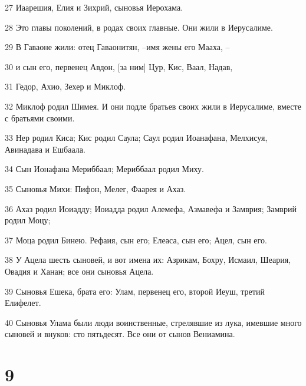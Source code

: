\par 27 Иаарешия, Елия и Зихрий, сыновья Иерохама.
\par 28 Это главы поколений, в родах своих главные. Они жили в Иерусалиме.
\par 29 В Гаваоне жили: отец Гаваонитян, --имя жены его Мааха, --
\par 30 и сын его, первенец Авдон, [за ним] Цур, Кис, Ваал, Надав,
\par 31 Гедор, Ахио, Зехер и Миклоф.
\par 32 Миклоф родил Шимея. И они подле братьев своих жили в Иерусалиме, вместе с братьями своими.
\par 33 Нер родил Киса; Кис родил Саула; Саул родил Иоанафана, Мелхисуя, Авинадава и Ешбаала.
\par 34 Сын Ионафана Мериббаал; Мериббаал родил Миху.
\par 35 Сыновья Михи: Пифон, Мелег, Фаарея и Ахаз.
\par 36 Ахаз родил Иоиадду; Иоиадда родил Алемефа, Азмавефа и Замврия; Замврий родил Моцу;
\par 37 Моца родил Бинею. Рефаия, сын его; Елеаса, сын его; Ацел, сын его.
\par 38 У Ацела шесть сыновей, и вот имена их: Азрикам, Бохру, Исмаил, Шеария, Овадия и Ханан; все они сыновья Ацела.
\par 39 Сыновья Ешека, брата его: Улам, первенец его, второй Иеуш, третий Елифелет.
\par 40 Сыновья Улама были люди воинственные, стрелявшие из лука, имевшие много сыновей и внуков: сто пятьдесят. Все они от сынов Вениамина.

\chapter{9}

